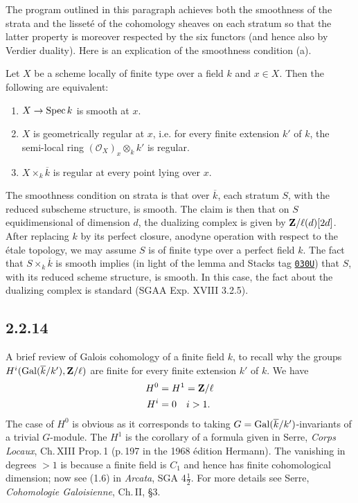 \documentclass[deligne.tex]{subfiles}
\begin{document}
The program outlined in this paragraph achieves both the smoothness of the
strata and the lisseté of the cohomology sheaves on each stratum so that 
the latter property is moreover respected by the six functors (and hence
also by Verdier duality).
Here is an explication of the smoothness condition (a).
	\begin{lemma*}
		Let $X$ be a scheme locally of finite type over a field $k$ and
		$x\in X$. Then the following are equivalent:
		\begin{enumerate}[label=(\roman*)]
			\item $X\rightarrow\operatorname{Spec} k$ is smooth at $x$.
			\item $X$ is geometrically regular at $x$, i.e. for every finite extension $k'$ of $k$, the semi-local ring $(\mathcal O_X)_x\otimes_k k'$ is regular.
			\item $X\times_k \overline k$ is regular at every point lying over $x$.
		\end{enumerate}
	\end{lemma*}
	The smoothness condition on strata is that over $\overline k$, each
	stratum $S$, with the reduced subscheme structure, is smooth.
	The claim is then that on $S$ equidimensional of dimension $d$, the
	dualizing complex is given by $\mathbf{Z}/\ell(d)[2d]$.
	After replacing $k$ by its perfect closure, anodyne operation with
	respect to the étale topology, we may assume $S$ is of finite type over a
	perfect field $k$. The fact that $S\times_k\overline k$ is smooth implies
	(in light of the lemma and Stacks tag 
	\href{https://stacks.math.columbia.edu/tag/030U}{\texttt{030U}})
	that $S$, with its reduced scheme structure, is smooth.
	In this case, the fact about the dualizing complex is standard
	(SGAA Exp. XVIII 3.2.5).
	
	\subsection*{2.2.14} A brief review of Galois cohomology of a finite
	field $k$, to recall why the groups $H^i(\operatorname{Gal}(\overline k/k'),\mathbf{Z}/\ell)$
	are finite for every finite extension $k'$ of $k$. We have
	\begin{align*}
		H^0&=H^1=\mathbf{Z}/\ell \\
		H^i&=0\quad i>1.
	\end{align*}
	The case of $H^0$ is obvious as it corresponds to taking
	$G=\operatorname{Gal}(\overline k/k')$-invariants of a trivial
	$G$-module. The $H^1$ is the corollary of a formula given in Serre,
	\emph{Corps Locaux}, Ch.\,XIII Prop.\,1 (p.\,197 in the 1968 édition Hermann).
	The vanishing in
	degrees $>1$ is because a finite field is $C_1$ and hence has finite
	cohomological dimension; now see (1.6) in
	\emph{Arcata}, SGA 4$\frac12$. For more details see Serre,
	\emph{Cohomologie Galoisienne}, Ch.\,II, \S3.
	
\end{document}
